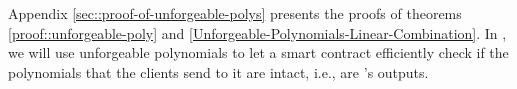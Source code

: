 %
%



\vspace{-1.2mm}

Appendix \ref{sec::proof-of-unforgeable-polys} presents the proofs of theorems \ref{proof::unforgeable-poly} and \ref{Unforgeable-Polynomials-Linear-Combination}. In \withFai, we will use unforgeable polynomials to let a smart contract efficiently check if the polynomials that the clients send to it are intact, i.e.,  are \vopr's outputs.







